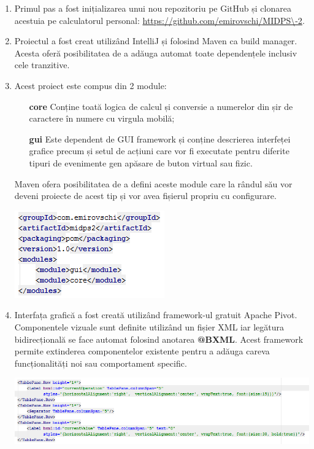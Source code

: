\begin{enumerate}
\item Primul pas a fost inițializarea unui nou repozitoriu pe GitHub și clonarea acestuia pe calculatorul personal: \url{https://github.com/emirovschi/MIDPS\-2}.
\item Proiectul a fost creat utilizând IntelliJ\cite{IntelliJ} și folosind Maven\cite{Maven} ca build manager. Acesta oferă posibilitatea de a adăuga automat toate dependențele inclusiv cele tranzitive.
\item Acest proiect este compus din 2 module:
\begin{enumerate}
\item [\textbf{core}] Conține toată logica de calcul și conversie a numerelor din șir de caractere în numere cu virgula mobilă;
\item [\textbf{gui}] Este dependent de GUI framework și conține descrierea interfeței grafice precum și setul de acțiuni care vor fi executate pentru diferite tipuri de evenimente gen apăsare de buton virtual sau fizic.
\end{enumerate}
Maven ofera posibilitatea de a defini aceste module care la rândul său vor deveni proiecte de acest tip și vor avea fișierul propriu cu configurare.

\begin{minipage}{\linewidth}
	\centering
	\includegraphics{modules}
\end{minipage}
\break

\item Interfața grafică a fost creată utilizând framework-ul gratuit Apache Pivot\cite{Pivot}. Componentele vizuale sunt definite utilizând un fișier XML iar legătura bidirecțională se face automat folosind anotarea \textbf{@BXML}. Acest framework permite extinderea componentelor existente pentru a adăuga careva funcționalități noi sau comportament specific.

\begin{minipage}{\linewidth}
	\centering
	\includegraphics[width=17cm]{xml}
\end{minipage}
\break


\end{enumerate}
